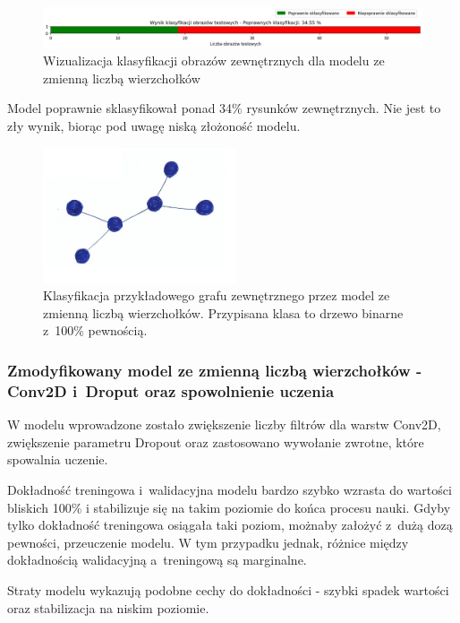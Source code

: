 \begin{figure}[ht]
	\centering
	\includegraphics[width=15.5cm]{resources/tests/images/v3/multiple_edges_bar.png}
	\caption{Wizualizacja klasyfikacji obrazów zewnętrznych dla modelu ze zmienną liczbą wierzchołków}
	\label{Fig:tests-var-0c}
\end{figure}
\FloatBarrier

Model poprawnie sklasyfikował ponad 34\% rysunków zewnętrznych.
Nie jest to zły wynik, biorąc pod uwagę niską złożoność modelu.

\begin{figure}[ht]
	\centering
	\includegraphics[height=4cm]{../graph_classification/test_graphs/drawn/tree-binary-1.png}
	\caption{Klasyfikacja przykładowego grafu zewnętrznego przez model ze zmienną liczbą wierzchołków.
		Przypisana klasa to drzewo binarne z~100\% pewnością.}
	\label{Fig:tests-var-0d}
\end{figure}
\FloatBarrier

\subsubsection{Zmodyfikowany model ze zmienną liczbą wierzchołków - Conv2D i~Droput oraz spowolnienie uczenia}

W modelu wprowadzone zostało zwiększenie liczby filtrów dla warstw Conv2D, zwiększenie parametru Dropout
oraz zastosowano wywołanie zwrotne, które spowalnia uczenie.

Dokładność treningowa i~walidacyjna modelu bardzo szybko wzrasta do wartości bliskich 100\%
i stabilizuje się na takim poziomie do końca procesu nauki.
Gdyby tylko dokładność treningowa osiągała taki poziom, możnaby założyć z~dużą dozą pewności, przeuczenie modelu.
W tym przypadku jednak, różnice między dokładnością walidacyjną a~treningową są marginalne.

Straty modelu wykazują podobne cechy do dokładności - szybki spadek wartości oraz stabilizacja na niskim poziomie.

